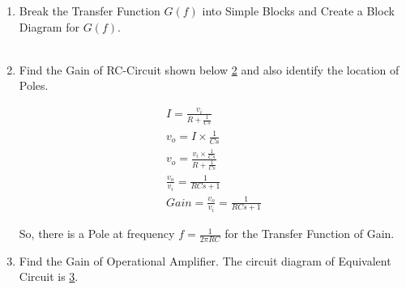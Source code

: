 \begin{enumerate}[label=\thesection.\arabic*.,ref=\thesection.\theenumi]
%
%
\item Break the Transfer Function $G(f)$ into Simple Blocks and Create a Block Diagram for $G(f)$.\\
\solution\\
\begin{figure}[ht!]
	\begin{center}
		\resizebox{\columnwidth}{!}{}
	\end{center}
	\caption{}
	\label{fig:ee18btech11014_RC Circuit}
\end{figure}

\item Find the Gain of RC-Circuit shown below \ref{fig:ee18btech11014_RC Circuit} and also identify the location of Poles.
\begin{figure}[ht!]
	\begin{center}
		\resizebox{\columnwidth/2}{!}{}
	\end{center}
	\caption{}
	\label{fig:ee18btech11014_RC Circuit}
\end{figure}

\solution
\begin{align}
I = \frac{v_{i}}{R + \frac{1}{Cs}}\\
v_{o} = I \times \frac{1}{Cs}\\
v_{o} = \frac{v_{i} \times \frac{1}{Cs}}{R + \frac{1}{Cs}}\\
\frac{v_{o}}{v_{i}} = \frac{1}{RCs + 1}\\
Gain = \frac{v_{o}}{v_{i}} = \frac{1}{RCs + 1}
\end{align}

So, there is a Pole at frequency $f = \frac{1}{2\pi RC}$ for the Transfer Function of Gain.\\
\item Find the Gain of Operational Amplifier. The circuit diagram of Equivalent Circuit is \ref{fig:ee18btech11014_OpAmp Circuit}.
\begin{figure}[ht!]
	\begin{center}
		\resizebox{\columnwidth}{!}{}
	\end{center}
	\caption{}
	\label{fig:ee18btech11014_OpAmp Circuit}
\end{figure}


\end{enumerate}
